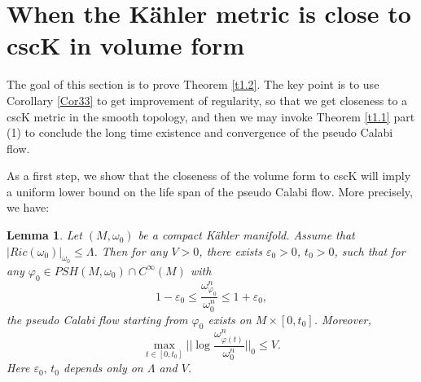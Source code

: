\documentclass[11pt]{amsart}
\newtheorem{lem}{Lemma}[section]
\numberwithin{equation}{section}
\newcommand \eps{\varepsilon}
\begin{document}
\section{When the K\"ahler metric is close to cscK in volume form \\}
The goal of this section is to prove Theorem \ref{t1.2}. 
The key point is to use Corollary \ref{Cor33} to get improvement of regularity,  so that we get closeness to a cscK metric in the smooth topology,  and then we may invoke Theorem \ref{t1.1} part (1) to conclude the long time existence and convergence of the pseudo Calabi flow.

As a first step,  we show that the closeness of the volume form to cscK will imply a uniform lower bound on the life span of the pseudo Calabi flow.  More precisely,  we have:

\begin{lem}\label{l5.1New}
Let $(M,\omega_0)$ be a compact K\"ahler manifold.  Assume that $|Ric(\omega_0)|_{\omega_0}\le \Lambda$.  Then for any $V>0$,  there exists $\eps_0>0$,  $t_0>0$,  such that for any $\varphi_0\in PSH(M,\omega_0)\cap C^{\infty}(M)$ with 
\begin{equation}\label{5.1New}
1-\eps_0\le \frac{\omega_{\varphi_0}^n}{\omega_0^n}\le 1+\eps_0,
\end{equation}
the pseudo Calabi flow starting from $\varphi_0$ exists on $M\times [0,t_0]$.  Moreover, 
\begin{equation*}
\max_{t\in [0,t_0]}||\log\frac{\omega_{\varphi(t)}^n}{\omega_0^n}||_0\le V.
\end{equation*}
Here $\eps_0,\,t_0$ depends only on $\Lambda$ and $V$.
\end{lem}
\end{document}
